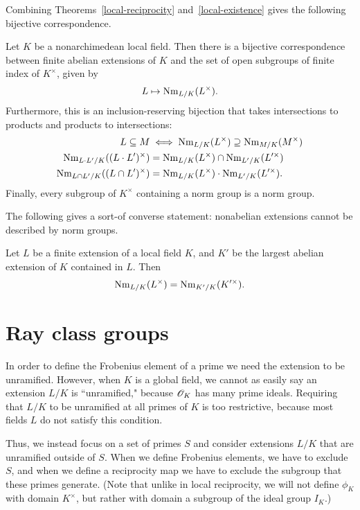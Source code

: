 Combining Theorems~\ref{local-reciprocity} and~\ref{local-existence} gives the following bijective correspondence.
\begin{thm}
Let $K$ be a nonarchimedean local field. Then there is a bijective correspondence between finite abelian extensions of $K$ and the set of %
open subgroups of finite index of $K^{\times}$, given by
\[
L\mapsto\operatorname{Nm}_{L/K}(L^{\times}).
\]
Furthermore, this is an inclusion-reserving bijection that takes intersections to products and products to intersections:
\begin{align*}
L\subeq M&\iff \nm_{L/K}(L^{\times})\supeq \nm_{M/K}(M^{\times})\\
\nm_{L\cdot L'/K}((L\cdot L')^{\times})&=\nm_{L/K}(L^{\times})\cap \nm_{L'/K}(L'^{\times})\\%
\nm_{L\cap L'/K}((L\cap L')^{\times})&=\nm_{L/K}(L^{\times})\cdot \nm_{L'/K}(L'^{\times}).
\end{align*}
Finally, every subgroup of $K^{\times}$ containing a norm group is a norm group. 
\end{thm}

The following gives a sort-of converse statement: nonabelian extensions cannot be described by norm groups.
\begin{thm}
Let $L$ be a finite extension of a local field $K$, and $K'$ be the largest abelian extension of $K$ contained in $L$. Then 
\[
\operatorname{Nm}_{L/K}(L^{\times})=\operatorname{Nm}_{K'/K}(K'^{\times}).
\]
\end{thm}
\section{Ray class groups}
In order to define the Frobenius element of a prime we need the extension to be unramified. However, when $K$ is a global field, we cannot as easily say an extension $L/K$ is ``unramified," because $\mathscr{O}_K$ has many prime ideals. Requiring that $L/K$ to be unramified at all primes of $K$ is too restrictive, because most fields $L$ do not satisfy this condition.

Thus, we instead focus on a set of primes $S$ and consider extensions $L/K$ that are unramified outside of $S$. 
When we define Frobenius elements, we have to exclude $S$, and when we define a reciprocity map we have to exclude the subgroup that these primes generate. (Note that unlike in local reciprocity, we will not define $\phi_K$ with domain $K^{\times}$, but rather with domain a subgroup of the ideal group $I_K$.)
 
